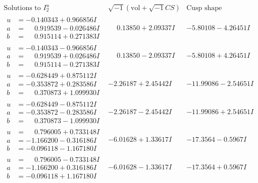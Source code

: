\documentclass[1p]{elsarticle_modified}
\theoremstyle{definition}
\newcommand{\I}{\sqrt{-1}}
\begin{document}
$$\begin{array}{c|c|c}  
\text{Solutions to }I^u_{2}& \I (\text{vol} + \sqrt{-1}CS) & \text{Cusp shape}\\
 \hline 
\begin{aligned}
u &= -0.140343 + 0.966856 I \\
a &= \phantom{-}0.919539 - 0.026486 I \\
b &= \phantom{-}0.915114 + 0.271383 I\end{aligned}
 & \phantom{-}0.13850 + 2.09337 I & -5.80108 - 4.26451 I \\ \hline\begin{aligned}
u &= -0.140343 - 0.966856 I \\
a &= \phantom{-}0.919539 + 0.026486 I \\
b &= \phantom{-}0.915114 - 0.271383 I\end{aligned}
 & \phantom{-}0.13850 - 2.09337 I & -5.80108 + 4.26451 I \\ \hline\begin{aligned}
u &= -0.628449 + 0.875112 I \\
a &= -0.353872 + 0.283586 I \\
b &= \phantom{-}0.370873 + 1.099930 I\end{aligned}
 & -2.26187 + 2.45442 I & -11.99086 - 2.54651 I \\ \hline\begin{aligned}
u &= -0.628449 - 0.875112 I \\
a &= -0.353872 - 0.283586 I \\
b &= \phantom{-}0.370873 - 1.099930 I\end{aligned}
 & -2.26187 - 2.45442 I & -11.99086 + 2.54651 I \\ \hline\begin{aligned}
u &= \phantom{-}0.796005 + 0.733148 I \\
a &= -1.166200 - 0.316186 I \\
b &= -0.096118 - 1.167180 I\end{aligned}
 & -6.01628 + 1.33617 I & -17.3564 - 0.5967 I \\ \hline\begin{aligned}
u &= \phantom{-}0.796005 - 0.733148 I \\
a &= -1.166200 + 0.316186 I \\
b &= -0.096118 + 1.167180 I\end{aligned}
 & -6.01628 - 1.33617 I & -17.3564 + 0.5967 I \\ \hline\begin{aligned}

\end{aligned}
\end{array}$$
\end{document}

